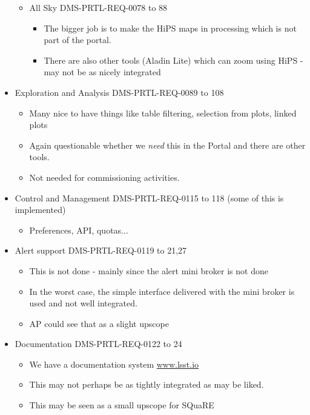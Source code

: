 \begin{itemize}
\begin{itemize}
\item All Sky  DMS-PRTL-REQ-0078 to 88
\begin{itemize}
\item The bigger job is to make the HiPS maps in  processing which is not part of the portal.
\item There are also other tools (Aladin Lite) which can zoom using HiPS - may not be as nicely integrated
\end{itemize}

\end{itemize}

\item Exploration and Analysis DMS-PRTL-REQ-0089 to 108
\begin{itemize}
\item Many nice to have things like table filtering, selection from plots, linked plots
\item Again questionable whether we \emph{need} this in the Portal and there are other tools.
\item Not needed for commissioning activities.
\end{itemize}

\item Control and Management DMS-PRTL-REQ-0115 to 118 (some of this is implemented)
\begin{itemize}
\item Preferences, API, quotas...
\end{itemize}
\item Alert support DMS-PRTL-REQ-0119 to 21,27
\begin{itemize}
\item This is not done - mainly since the alert mini broker is not done
\item In the worst  case, the simple interface delivered with the mini broker is used and not well integrated.
\item AP could see that as a slight upscope
\end{itemize}

\item Documentation DMS-PRTL-REQ-0122 to 24
\begin{itemize}
\item  We have a documentation system \url{www.lsst.io}
\item This may not perhaps be  as tightly integrated as may be liked.
\item This may be seen as a small upscope for SQuaRE
\end{itemize}
\end{itemize}


